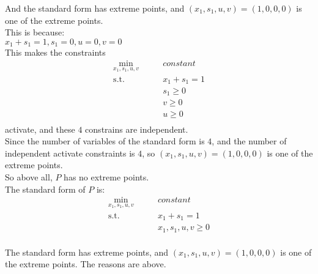 \documentclass[10pt]{article}
\begin{document}
And the standard form has extreme points, and $(x_1,s_1,u,v)=(1,0,0,0)$ is one of the extreme points.\\
This is because:\\
$x_1+s_1=1, s_1=0, u=0, v=0$\\
This makes the constraints 
\begin{equation}
	\begin{aligned}
		\min_{x_1,s_1,u,v}\qquad & constant \\ 
		\mathrm{s.t.}\qquad & x_1+s_1=1 \\
							& s_1\geq 0 \\
							& v\geq 0 \\
							& u\geq 0 \\
	\end{aligned}
\end{equation}
activate, and these $4$ constrains are independent.\\
Since the number of variables of the standard form is $4$, and the number of independent activate constraints is $4$, so $(x_1,s_1,u,v)=(1,0,0,0)$ is one of the extreme points.\\ 


So above all, $P$ has no extreme points.\\
The standard form of $P$ is:\\
\begin{equation}
	\begin{aligned}
		\min_{x_1,s_1,u,v}\qquad & constant \\ 
		\mathrm{s.t.}\qquad & x_1+s_1=1 \\
							& x_1,s_1,u,v\geq 0 \\
	\end{aligned}
\end{equation}

The standard form has extreme points, and $(x_1,s_1,u,v)=(1,0,0,0)$ is one of the extreme points. The reasons are above.\\
\end{document}
